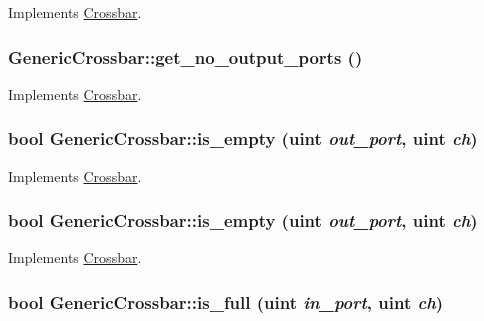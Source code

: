 Implements \hyperlink{classCrossbar_fa381d5e1af2576a2aaa5fb392072918}{Crossbar}.\hypertarget{classGenericCrossbar_6ca09eb5520228b39d718e3994a5b84f}{
\subsubsection[{get\_\-no\_\-output\_\-ports}]{ GenericCrossbar::get\_\-no\_\-output\_\-ports ()}}
\label{classGenericCrossbar_6ca09eb5520228b39d718e3994a5b84f}




Implements \hyperlink{classCrossbar_fa381d5e1af2576a2aaa5fb392072918}{Crossbar}.\hypertarget{classGenericCrossbar_b1dc236c4543805ac9fd50f25adcc27e}{
\subsubsection[{is\_\-empty}]{\setlength{\rightskip}{0pt plus 5cm}bool GenericCrossbar::is\_\-empty ({\bf uint} {\em out\_\-port}, \/  {\bf uint} {\em ch})}}
\label{classGenericCrossbar_b1dc236c4543805ac9fd50f25adcc27e}




Implements \hyperlink{classCrossbar_dc95dc76ac1c9f02a80ce7ada4559ce3}{Crossbar}.\hypertarget{classGenericCrossbar_b1dc236c4543805ac9fd50f25adcc27e}{
\subsubsection[{is\_\-empty}]{\setlength{\rightskip}{0pt plus 5cm}bool GenericCrossbar::is\_\-empty ({\bf uint} {\em out\_\-port}, \/  {\bf uint} {\em ch})}}
\label{classGenericCrossbar_b1dc236c4543805ac9fd50f25adcc27e}




Implements \hyperlink{classCrossbar_dc95dc76ac1c9f02a80ce7ada4559ce3}{Crossbar}.\hypertarget{classGenericCrossbar_1949b9db3b5b1950ad6a2c9e46103024}{
\subsubsection[{is\_\-full}]{\setlength{\rightskip}{0pt plus 5cm}bool GenericCrossbar::is\_\-full ({\bf uint} {\em in\_\-port}, \/  {\bf uint} {\em ch})}}
\label{classGenericCrossbar_1949b9db3b5b1950ad6a2c9e46103024}




